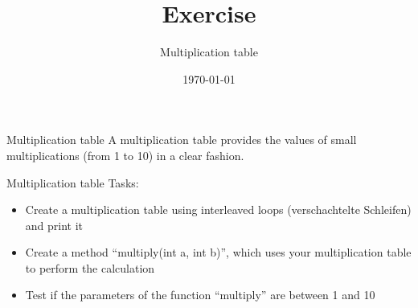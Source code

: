 


\title{Exercise}
\subtitle{Multiplication table}
\date{\today}




\begin{frame}
    \titlepage
\end{frame}

\begin{frame}{Multiplication table}
    A multiplication table provides the values of small multiplications (from 1 to 10) in a clear fashion.
\end{frame}

\begin{frame}{Multiplication table}
    Tasks:
    \begin{itemize}
        \item Create a multiplication table using interleaved loops (verschachtelte Schleifen) and print it
        \item Create a method ``multiply(int a, int b)'', which uses your multiplication table to perform the calculation
        \item Test if the parameters of the function ``multiply'' are between 1 and 10
    \end{itemize}
\end{frame}




